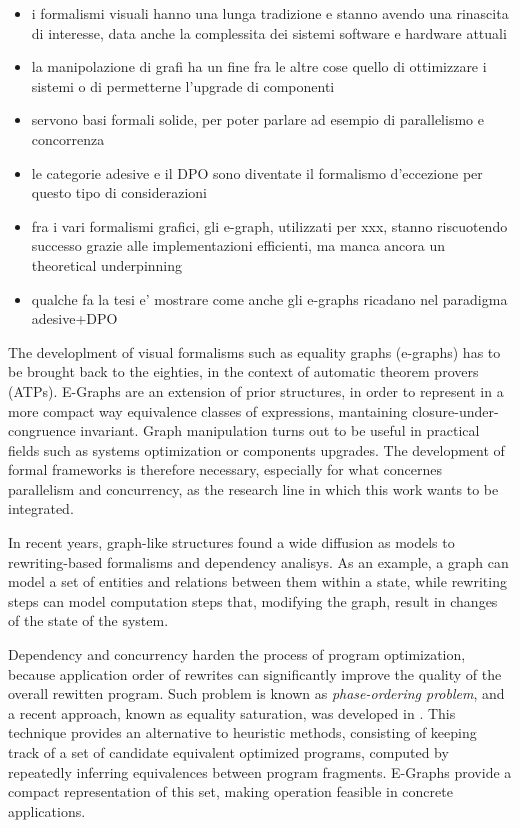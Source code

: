 \begin{itemize}
\item i formalismi visuali hanno una lunga tradizione e stanno avendo una rinascita di interesse, data anche la complessita dei sistemi software e hardware attuali
\item la manipolazione di grafi ha un fine fra le altre cose quello di ottimizzare i sistemi o di permetterne l'upgrade di componenti
\item servono basi formali solide, per poter parlare ad esempio di parallelismo e concorrenza
\item le categorie adesive e il DPO sono diventate il formalismo d'eccezione per questo tipo di considerazioni
\item fra i vari formalismi grafici, gli e-graph, utilizzati per xxx, stanno riscuotendo successo grazie alle implementazioni efficienti, ma manca ancora un theoretical underpinning
\item qualche fa la tesi e' mostrare come anche gli e-graphs ricadano nel paradigma adesive+DPO
\end{itemize}

\fi

The developlment of visual formalisms such as equality graphs (e-graphs) has to be brought back to the eighties, in the context of automatic theorem provers (ATPs).
E-Graphs are an extension of prior structures, in order to represent in a more compact way equivalence classes of expressions, mantaining closure-under-congruence invariant.
Graph manipulation turns out to be useful in practical fields such as systems optimization or components upgrades.
The development of formal frameworks is therefore necessary, especially for what concernes parallelism and concurrency, as the research line in which this work wants to be integrated.

In recent years, graph-like structures found a wide diffusion as models to rewriting-based formalisms and dependency analisys.
As an example, a graph can model a set of entities and relations between them within a state, while rewriting steps can model computation steps that, modifying the graph, result in changes of the state of the system.

Dependency and concurrency harden the process of program optimization, because application order of rewrites can significantly improve the quality of the overall rewitten program.
Such problem is known as \textit{phase-ordering problem}, and a recent approach, known as equality saturation, was developed in \cite{Tate_2011}.
This technique provides an alternative to heuristic methods, consisting of keeping track of a set of candidate equivalent optimized programs, 
computed by repeatedly inferring equivalences between program fragments.
E-Graphs provide a compact representation of this set, making operation feasible in concrete applications.

